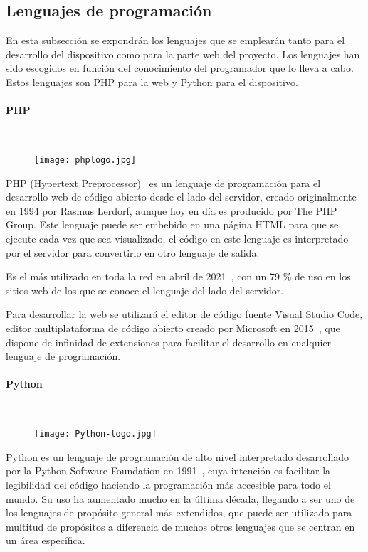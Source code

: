 \subsection{Lenguajes de programación}\label{subsec:lenguajes}
En esta subsección se expondrán los lenguajes que se emplearán tanto para el desarrollo del dispositivo como para la parte web del proyecto. Los lenguajes han sido escogidos en función del conocimiento del programador que lo lleva a cabo. Estos lenguajes son PHP para la web y Python para el dispositivo.

\paragraph{PHP}\mbox{} \\
\begin{figure}[H]
	{\texttt{[image: phplogo.jpg]}}\label{fig:phpLogo}
\end{figure}
PHP (Hypertext Preprocessor)~\cite{welling_php_2003} es un lenguaje de programación para el desarrollo web de código abierto desde el lado del servidor, creado originalmente en 1994 por Rasmus Lerdorf, aunque hoy en día es producido por The PHP Group. Este lenguaje puede ser embebido en una página HTML para que se ejecute cada vez que sea visualizado, el código en este lenguaje es interpretado por el servidor para convertirlo en otro lenguaje de salida.

Es el más utilizado en toda la red en abril de 2021~\cite{q-success_usage_nodate}, con un 79 \% de uso en los sitios web de los que se conoce el lenguaje del lado del servidor.

Para desarrollar la web se utilizará el editor de código fuente Visual Studio Code, editor multiplataforma de código abierto creado por Microsoft en 2015~\cite{noauthor_visual_2021}, que dispone de infinidad de extensiones para facilitar el desarrollo en cualquier lenguaje de programación.

\paragraph{Python}\mbox{} \\
\begin{figure}[H]
	{\texttt{[image: Python-logo.jpg]}}\label{fig:logoPython}
\end{figure}
Python es un lenguaje de programación de alto nivel interpretado desarrollado por la Python Software Foundation en 1991~\cite{montoro_python_2012}, cuya intención es facilitar la legibilidad del código haciendo la programación más accesible para todo el mundo. Su uso ha aumentado mucho en la última década, llegando a ser uno de los lenguajes de propósito general más extendidos, que puede ser utilizado para multitud de propósitos a diferencia de muchos otros lenguajes que se centran en un área específica.

